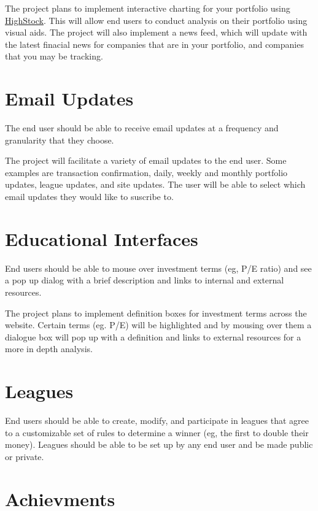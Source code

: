 \documentclass[11pt,letterpaper,oneside]{memoir}
\begin{document}
The project plans to implement interactive charting for your portfolio using
\href{http://www.highcharts.com/products/highstock}{HighStock}.  This will allow
end users to conduct analysis on their portfolio using visual aids.  The project
will also implement a news feed, which will update with the latest finacial news
for companies that are in your portfolio, and companies that you may be tracking.

\section{Email Updates}

The end user should be able to receive email updates at a frequency and granularity that they choose.

The project will facilitate a variety of email updates to the end user.  Some examples are
transaction confirmation, daily, weekly and monthly portfolio updates, league updates, and
site updates.  The user will be able to select which email updates they would like to suscribe
to.

\section{Educational Interfaces}

End users should be able to mouse over investment terms (eg, P/E ratio) and see a pop up
dialog with a brief description and links to internal and external resources.

The project plans to implement definition boxes for investment terms across the website.
Certain terms (eg. P/E) will be highlighted and by mousing over them a dialogue box will pop
up with a definition and links to external resources for a more in depth analysis.

\section{Leagues}

End users should be able to create, modify, and participate in leagues that agree to a customizable
set of rules to determine a winner (eg, the first to double their money).  Leagues should be able
to be set up by any end user and be made public or private.

\section{Achievments}
\end{document}
